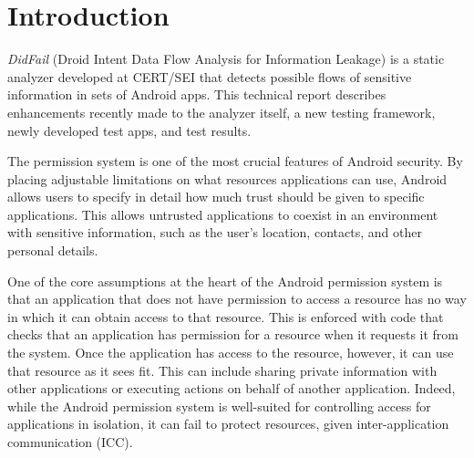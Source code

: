 \makeatletter
\patchcmd{\chapter}{\if@openright\cleardoublepage\else\clearpage\fi}{\vspace{1in}}{}{}
\makeatother

\nonfrenchspacing


\chapter{Introduction}
\label{sec:intro}
\textit{DidFail} (Droid Intent Data Flow Analysis for Information Leakage) is
a static analyzer developed at CERT/SEI that detects possible flows of sensitive
information in sets of Android apps. 
This technical report describes enhancements recently made to the analyzer
itself, a new testing framework, newly developed test apps, and test results. 

The permission system is one of the most crucial features of Android security. By placing adjustable limitations on what resources applications can use, Android allows users to specify in detail how much trust should be given to specific applications. This allows untrusted applications to coexist in an environment with sensitive information, such as the user's location, contacts, and other personal details. 

One of the core assumptions at the heart of the Android permission system is that an application that does not have permission to access a resource has no way in which it can obtain access to that resource. This is enforced with code that checks that an application has permission for a resource when it requests it from the system. Once the application has access to the resource, however, it can use that resource as it sees fit. This can include sharing private information with other applications or executing actions on behalf of another application. Indeed, while the Android permission system is well-suited for controlling access for applications in isolation, it can fail to protect resources, given inter-application communication (ICC).

